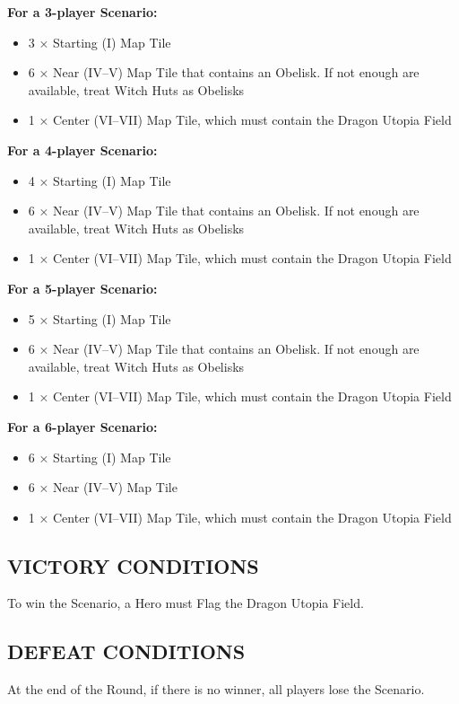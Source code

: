 \begin{multicols}{2}
\textbf{For a 3-player Scenario:}
\begin{itemize}
  \item 3 × Starting (I) Map Tile
  \item 6 × Near (IV--V) Map Tile that contains an Obelisk. If not enough are available, treat Witch Huts as Obelisks
  \item 1 × Center (VI--VII) Map Tile, which must contain the Dragon Utopia Field
\end{itemize}

\textbf{For a 4-player Scenario:}
\begin{itemize}
  \item 4 × Starting (I) Map Tile
  \item 6 × Near (IV--V) Map Tile that contains an Obelisk. If not enough are available, treat Witch Huts as Obelisks
  \item 1 × Center (VI--VII) Map Tile, which must contain the Dragon Utopia Field
\end{itemize}

\textbf{For a 5-player Scenario:}
\begin{itemize}
  \item 5 × Starting (I) Map Tile
  \item 6 × Near (IV--V) Map Tile that contains an Obelisk. If not enough are available, treat Witch Huts as Obelisks
  \item 1 × Center (VI--VII) Map Tile, which must contain the Dragon Utopia Field
\end{itemize}

\textbf{For a 6-player Scenario:}
\begin{itemize}
  \item 6 × Starting (I) Map Tile
  \item 6 × Near (IV--V) Map Tile
  \item 1 × Center (VI--VII) Map Tile, which must contain the Dragon Utopia Field
\end{itemize}

\subsection*{\MakeUppercase{Victory Conditions}}
To win the Scenario, a Hero must Flag the Dragon Utopia Field.

\vspace*{\fill}

\subsection*{\MakeUppercase{Defeat Conditions}}
At the end of the  Round, if there is no winner, all players lose the Scenario.


\end{multicols}
